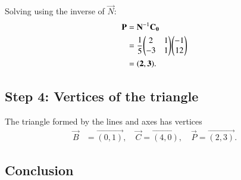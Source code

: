 \documentclass[journal]{IEEEtran}
\begin{document}
Solving using the inverse of $\vec{N}$:
\begin{align}
\mathbf{P} &= \mathbf{N}^{-1} \mathbf{C_0} \notag\\
&= \frac{1}{5} \mathbf{\begin{pmatrix}2 & 1 \\ -3 & 1\end{pmatrix}} \mathbf{\begin{pmatrix}-1 \\ 12\end{pmatrix}} \notag\\
&= \mathbf{(2,3)}. 
\end{align}

\subsection*{Step 4: Vertices of the triangle}

The triangle formed by the lines and axes has vertices
\begin{align}
\vec{B} &= \vec{(0,1)}, \quad 
\vec{C} = \vec{(4,0)}, \quad 
\vec{P} = \vec{(2,3)}. 
\end{align}

\subsection*{Conclusion}
\end{document}
